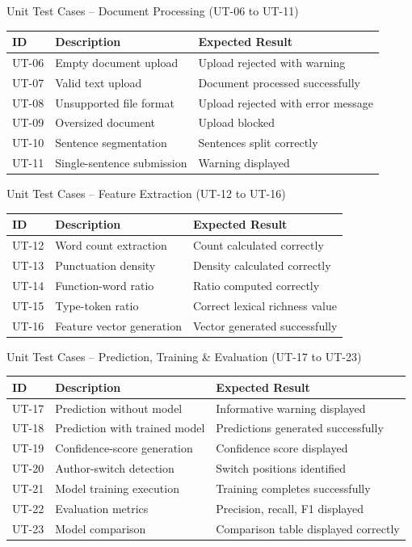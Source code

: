 \documentclass[compress,aspectratio=169]{beamer}
\begin{document}
\begin{frame}{Unit Test Cases – Document Processing (UT-06 to UT-11)}
\centering
\footnotesize
\begin{tabularx}{\textwidth}{p{1.2cm} X X}
\toprule
\textbf{ID} & \textbf{Description} & \textbf{Expected Result}\\
\midrule
UT-06 & Empty document upload & Upload rejected with warning\\
UT-07 & Valid text upload & Document processed successfully\\
UT-08 & Unsupported file format & Upload rejected with error message\\
UT-09 & Oversized document & Upload blocked\\
UT-10 & Sentence segmentation & Sentences split correctly\\
UT-11 & Single-sentence submission & Warning displayed\\
\bottomrule
\end{tabularx}
\end{frame}

\begin{frame}{Unit Test Cases – Feature Extraction (UT-12 to UT-16)}
\centering
\footnotesize
\begin{tabularx}{\textwidth}{p{1.2cm} X X}
\toprule
\textbf{ID} & \textbf{Description} & \textbf{Expected Result}\\
\midrule
UT-12 & Word count extraction & Count calculated correctly\\
UT-13 & Punctuation density & Density calculated correctly\\
UT-14 & Function-word ratio & Ratio computed correctly\\
UT-15 & Type-token ratio & Correct lexical richness value\\
UT-16 & Feature vector generation & Vector generated successfully\\
\bottomrule
\end{tabularx}
\end{frame}

\begin{frame}{Unit Test Cases – Prediction, Training \& Evaluation (UT-17 to UT-23)}
\centering
\footnotesize
\begin{tabularx}{\textwidth}{p{1.2cm} X X}
\toprule
\textbf{ID} & \textbf{Description} & \textbf{Expected Result}\\
\midrule
UT-17 & Prediction without model & Informative warning displayed\\
UT-18 & Prediction with trained model & Predictions generated successfully\\
UT-19 & Confidence-score generation & Confidence score displayed\\
UT-20 & Author-switch detection & Switch positions identified\\
UT-21 & Model training execution & Training completes successfully\\
UT-22 & Evaluation metrics & Precision, recall, F1 displayed\\
UT-23 & Model comparison & Comparison table displayed correctly\\
\bottomrule
\end{tabularx}
\end{frame}
\end{document}
